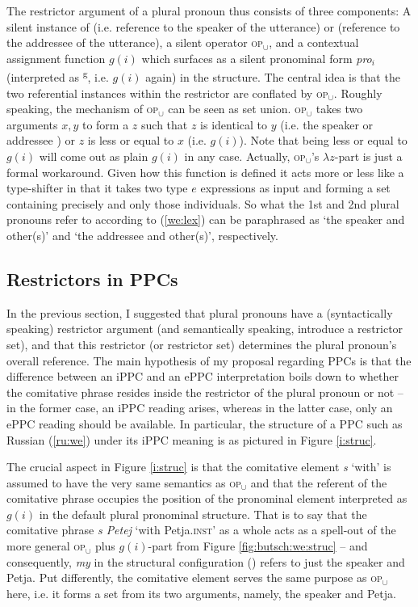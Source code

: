 \documentclass[output=paper,colorlinks,citecolor=brown]{langscibook}
\begin{document}
The restrictor argument of a plural pronoun thus consists of three components: A silent instance of  (i.e. reference to the speaker of the utterance) or  (reference to the addressee of the utterance), a silent operator \textsc{op}$_\cup$, and a contextual assignment function $g(i)$ which surfaces as a silent pronominal form \textit{pro}$_i$ (interpreted as \textsuperscript{g}, i.e. $g(i)$ again) in the structure. The central idea is that the two referential instances within the restrictor are conflated by \textsc{op}$_\cup$. Roughly speaking, the mechanism of \textsc{op}$_\cup$ can be seen as set union. \textsc{op}$_\cup$ takes two arguments $x, y$ to form a $z$ such that $z$ is identical to $y$ (i.e. the speaker  or addressee ) or $z$ is less or equal to $x$ (i.e. $g(i)$). Note that being less or equal to $g(i)$ will come out as plain $g(i)$ in any case. Actually, \textsc{op}$_\cup$'s $\lambda z$-part is just a formal workaround. Given how this function is defined it acts more or less like a type-shifter in that it takes two type $e$ expressions as input and forming a set containing precisely and only those individuals. So what the 1st and 2nd plural pronouns refer to according to (\ref{we:lex}) can be paraphrased as `the speaker and other(s)' and `the addressee and other(s)', respectively. 



\subsection{Restrictors in PPCs}\label{sec:ppc}
In the previous section, I suggested that plural pronouns have a (syntactically speaking) restrictor argument (and semantically speaking, introduce a restrictor set), and that this restrictor (or restrictor set) determines the plural pronoun's overall reference. The main hypothesis of my proposal regarding PPCs is that the difference between an iPPC and an ePPC interpretation boils down to whether the comitative phrase resides inside the restrictor of the plural pronoun or not -- in the former case, an iPPC reading arises, whereas in the latter case, only an ePPC reading should be available. In particular, the structure of a PPC such as Russian (\ref{ru:we}) under its iPPC meaning is as pictured in Figure \ref{i:struc}.


The crucial aspect in Figure \ref{i:struc} is that the comitative element \textit{s} `with' is assumed to have the very same semantics as \textsc{op}$_\cup$ and that the referent of the comitative phrase occupies the position of the pronominal element interpreted as $g(i)$ in the default plural pronominal structure. That is to say that the comitative phrase \textit{s Petej} `with Petja.\textsc{inst}' as a whole acts as a spell-out of the more general \textsc{op}$_\cup$ plus $g(i)$-part from Figure \ref{fig:butsch:we:struc} %
-- and consequently, \textit{my} in the structural configuration () refers to just the speaker and Petja. Put differently, the comitative element serves the same purpose as \textsc{op}$_\cup$ here, i.e. it forms a set from its two arguments, namely, the speaker and Petja.
\end{document}
